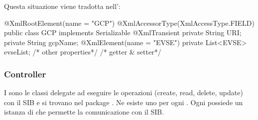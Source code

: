 Questa situazione viene tradotta nell':

\begin{java}[caption={Entity di esempio},label={lst:entity}]
@XmlRootElement(name = "GCP")
@XmlAccessorType(XmlAccessType.FIELD)
public class GCP implements Serializable {
	@XmlTransient
	private String URI;
	private String gcpName;
	@XmlElement(name = "EVSE")
	private List<EVSE> evseList;
	/* other properties*/
	/* getter & setter*/	
}
\end{java}




\subsubsection{Controller}

I  sono le classi delegate ad eseguire le operazioni  (create, read, delete, update) con il SIB e si trovano nel package . Ne esiste uno per ogni . Ogni  possiede un istanza di  che permette la comunicazione con il SIB. 

